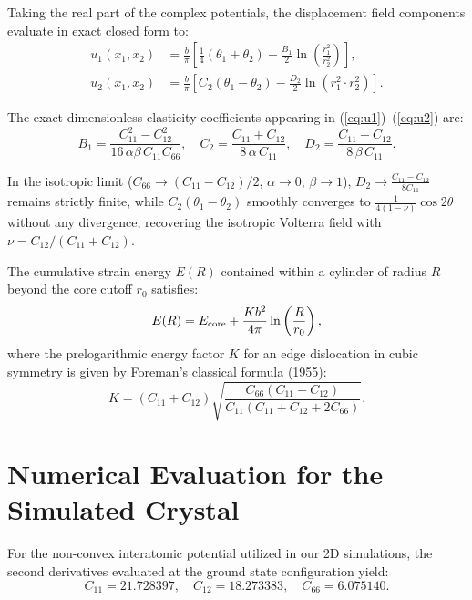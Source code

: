 \documentclass[11pt,a4paper]{article}
\begin{document}
Taking the real part of the complex potentials, the displacement field components evaluate in exact closed form to:
\begin{align}
u_1(x_1, x_2) &= \frac{b}{\pi} \left[ \frac{1}{4} (\theta_1 + \theta_2) - \frac{B_1}{2} \ln\left(\frac{r_1^2}{r_2^2}\right) \right], \label{eq:u1} \\
u_2(x_1, x_2) &= \frac{b}{\pi} \left[ C_2 (\theta_1 - \theta_2) - \frac{D_2}{2} \ln\left(r_1^2 \cdot r_2^2\right) \right]. \label{eq:u2}
\end{align}

The exact dimensionless elasticity coefficients appearing in (\ref{eq:u1})--(\ref{eq:u2}) are:
\begin{equation}
B_1 = \frac{C_{11}^2 - C_{12}^2}{16\,\alpha\beta\,C_{11} C_{66}}, \quad
C_2 = \frac{C_{11} + C_{12}}{8\,\alpha\,C_{11}}, \quad
D_2 = \frac{C_{11} - C_{12}}{8\,\beta\,C_{11}}.
\label{eq:coeffs}
\end{equation}

In the isotropic limit ($C_{66} \to (C_{11}-C_{12})/2$, $\alpha \to 0$, $\beta \to 1$), $D_2 \to \frac{C_{11}-C_{12}}{8 C_{11}}$ remains strictly finite, while $C_2 (\theta_1 - \theta_2)$ smoothly converges to $\frac{1}{4(1-\nu)} \cos 2\theta$ without any divergence, recovering the isotropic Volterra field with $\nu = C_{12}/(C_{11}+C_{12})$.

The cumulative strain energy $E(R)$ contained within a cylinder of radius $R$ beyond the core cutoff $r_0$ satisfies:
\begin{equation}
E(R) = E_{\rm core} + \frac{K b^2}{4\pi} \ln\left(\frac{R}{r_0}\right),
\end{equation}
where the prelogarithmic energy factor $K$ for an edge dislocation in cubic symmetry is given by Foreman's classical formula (1955):
\begin{equation}
K = (C_{11} + C_{12}) \sqrt{\frac{C_{66}(C_{11} - C_{12})}{C_{11}(C_{11} + C_{12} + 2 C_{66})}}.
\label{eq:energy_factor}
\end{equation}

\section{Numerical Evaluation for the Simulated Crystal}

For the non-convex interatomic potential utilized in our 2D simulations, the second derivatives evaluated at the ground state configuration yield:
\begin{equation}
C_{11} = 21.728397, \quad C_{12} = 18.273383, \quad C_{66} = 6.075140.
\end{equation}
\end{document}
